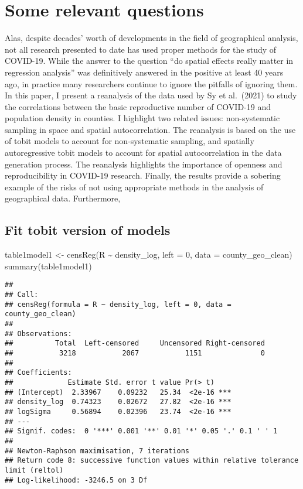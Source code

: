 \documentclass[10pt,letterpaper]{article}
\newenvironment{Shaded}{\begin{snugshade}}{\end{snugshade}}
\newcommand{\AttributeTok}[1]{\textcolor[rgb]{0.77,0.63,0.00}{#1}}
\newcommand{\DecValTok}[1]{\textcolor[rgb]{0.00,0.00,0.81}{#1}}
\newcommand{\FunctionTok}[1]{\textcolor[rgb]{0.00,0.00,0.00}{#1}}
\newcommand{\NormalTok}[1]{#1}
\newcommand{\OtherTok}[1]{\textcolor[rgb]{0.56,0.35,0.01}{#1}}
\newcommand{\SpecialCharTok}[1]{\textcolor[rgb]{0.00,0.00,0.00}{#1}}
\begin{document}
\hypertarget{some-relevant-questions}{%
\section{Some relevant questions}\label{some-relevant-questions}}

Alas, despite decades' worth of developments in the field of
geographical analysis, not all research presented to date has used
proper methods for the study of COVID-19. While the answer to the
question ``do spatial effects really matter in regression analysis'' was
definitively answered in the positive at least 40 years ago, in practice
many researchers continue to ignore the pitfalls of ignoring them. In
this paper, I present a reanalysis of the data used by Sy et al.~(2021)
to study the correlations between the basic reproductive number of
COVID-19 and population density in counties. I highlight two related
issues: non-systematic sampling in space and spatial autocorrelation.
The reanalysis is based on the use of tobit models to account for
non-systematic sampling, and spatially autoregressive tobit models to
account for spatial autocorrelation in the data generation process. The
reanalysis highlights the importance of openness and reproducibility in
COVID-19 research. Finally, the results provide a sobering example of
the risks of not using appropriate methods in the analysis of
geographical data. Furthermore,

\hypertarget{fit-tobit-version-of-models}{%
\subsection{Fit tobit version of
models}\label{fit-tobit-version-of-models}}

\begin{Shaded}
\begin{Highlighting}[]
\NormalTok{table1model1 }\OtherTok{\textless{}{-}} \FunctionTok{censReg}\NormalTok{(R }\SpecialCharTok{\textasciitilde{}}\NormalTok{ density\_log, }
                        \AttributeTok{left =} \DecValTok{0}\NormalTok{,}
                    \AttributeTok{data =}\NormalTok{ county\_geo\_clean)}
\FunctionTok{summary}\NormalTok{(table1model1)}
\end{Highlighting}
\end{Shaded}

\begin{verbatim}
## 
## Call:
## censReg(formula = R ~ density_log, left = 0, data = county_geo_clean)
## 
## Observations:
##          Total  Left-censored     Uncensored Right-censored 
##           3218           2067           1151              0 
## 
## Coefficients:
##             Estimate Std. error t value Pr(> t)    
## (Intercept)  2.33967    0.09232   25.34  <2e-16 ***
## density_log  0.74323    0.02672   27.82  <2e-16 ***
## logSigma     0.56894    0.02396   23.74  <2e-16 ***
## ---
## Signif. codes:  0 '***' 0.001 '**' 0.01 '*' 0.05 '.' 0.1 ' ' 1
## 
## Newton-Raphson maximisation, 7 iterations
## Return code 8: successive function values within relative tolerance limit (reltol)
## Log-likelihood: -3246.5 on 3 Df
\end{verbatim}
\end{document}
